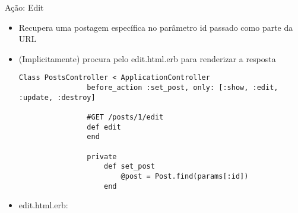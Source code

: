 \begin{frame}{Ação: Edit}
	\begin{itemize}
		\item Recupera uma postagem específica no parâmetro \alert{id} passado como parte da URL
		\item (Implicitamente) procura pelo \alert{edit.html.erb} para renderizar a resposta
		\begin{lstlisting}[style=RubyInputStyle, caption=posts_controller.rb]
			Class PostsController < ApplicationController
				before_action :set_post, only: [:show, :edit, :update, :destroy]
				
				#GET /posts/1/edit
				def edit 
				end 
				
				private
					def set_post 
						@post = Post.find(params[:id])
					end 
		\end{lstlisting}		
		
		\item \alert{edit.html.erb}:
		
				
	\end{itemize}	
\end{frame}